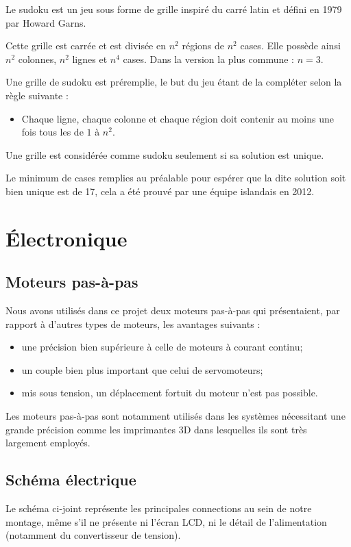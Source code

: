 \documentclass[12pt,a4paper]{report}
\begin{document}
	Le sudoku est un jeu sous forme de grille inspiré du carré latin et défini en 1979 par Howard Garns.
	
	Cette grille est carrée et est divisée en $n^2$ régions de $n^2$ cases. Elle possède ainsi $n^2$ colonnes, $n^2$ lignes et $n^4$ cases. Dans la version la plus commune : $n=3$.

Une grille de sudoku est préremplie, le but du jeu étant de la compléter selon la règle suivante :
\begin{itemize}[label=--]
\item Chaque ligne, chaque colonne et chaque région doit contenir au moins une fois tous les de $1$ à $n^2$.
\end{itemize} 

Une grille est considérée comme sudoku seulement si sa solution est unique.

Le minimum de cases remplies au préalable pour espérer que la dite solution soit bien unique est de 17, cela a été prouvé par une équipe islandais en 2012.

	\chapter{Électronique}
\section{Moteurs pas-à-pas}
Nous avons utilisés dans ce projet deux moteurs pas-à-pas qui présentaient, par rapport à d'autres types de moteurs, les avantages suivants : 
\begin{itemize}[label=--]
\item une précision bien supérieure à celle de moteurs à courant continu;
\item un couple bien plus important que celui de servomoteurs;
\item mis sous tension, un déplacement fortuit du moteur n'est pas possible.
\end{itemize}
Les moteurs pas-à-pas sont notamment utilisés dans les systèmes nécessitant une grande précision comme les imprimantes 3D dans lesquelles ils sont très largement employés.

\section{Schéma électrique}
Le schéma ci-joint représente les principales connections au sein de notre montage, même s'il ne présente ni l'écran LCD, ni le détail de l'alimentation (notamment du convertisseur de tension).
\end{document}
